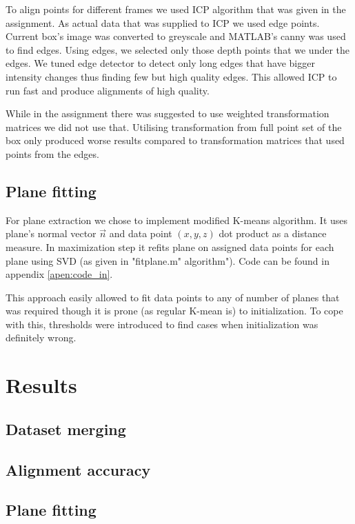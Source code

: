 \documentclass{article}
\begin{document}
To align points for different frames we used ICP algorithm
that was given in the assignment. As actual data that was 
supplied to ICP we used edge points. Current box's image
was converted to greyscale and MATLAB's canny was used
to find edges. Using edges, we selected only those
depth points that we under the edges. We tuned edge
detector to detect only long edges that have bigger
intensity changes thus finding few but high quality edges.
This allowed ICP to run fast and produce alignments
of high quality.

While in the assignment there was suggested to use
weighted transformation matrices we did not use that.
Utilising transformation from full point set of 
the box only produced worse results compared
to transformation matrices that used points from 
the edges.

\subsection{Plane fitting}
For plane extraction we chose to implement modified K-means algorithm.
It uses plane's normal vector $\vec{n}$  and data point $ (x,y,z) $
dot product as a distance measure. In maximization step it refits
plane on assigned data points for each plane
 using SVD (as given in "fitplane.m"
algorithm"). Code can be found in appendix \ref{apen:code_in}.

This approach easily allowed to fit data points to any of number of
planes that was required though it is prone (as regular K-mean is)
to initialization. To cope with this, thresholds were introduced
to find cases when initialization was definitely wrong.

\section{Results}

\subsection{Dataset merging}

\subsection{Alignment accuracy}

\subsection{Plane fitting}
\end{document}
